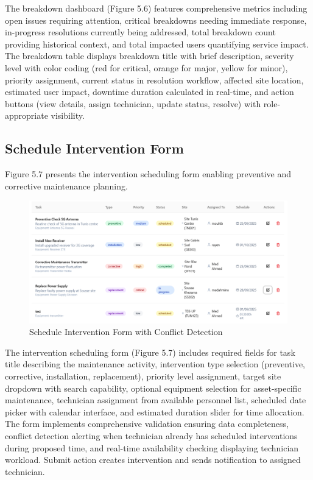 The breakdown dashboard (Figure 5.6) features comprehensive metrics including open issues requiring attention, critical breakdowns needing immediate response, in-progress resolutions currently being addressed, total breakdown count providing historical context, and total impacted users quantifying service impact. The breakdown table displays breakdown title with brief description, severity level with color coding (red for critical, orange for major, yellow for minor), priority assignment, current status in resolution workflow, affected site location, estimated user impact, downtime duration calculated in real-time, and action buttons (view details, assign technician, update status, resolve) with role-appropriate visibility.

\subsection{Schedule Intervention Form}

Figure 5.7 presents the intervention scheduling form enabling preventive and corrective maintenance planning.

\begin{figure}[H]
    \centering
    \includegraphics[width=0.7\linewidth]{img/chap_05/screenshot_schedule_intervention.png}
    \caption{Schedule Intervention Form with Conflict Detection}
    \label{fig:schedule_intervention_form}
\end{figure}

The intervention scheduling form (Figure 5.7) includes required fields for task title describing the maintenance activity, intervention type selection (preventive, corrective, installation, replacement), priority level assignment, target site dropdown with search capability, optional equipment selection for asset-specific maintenance, technician assignment from available personnel list, scheduled date picker with calendar interface, and estimated duration slider for time allocation. The form implements comprehensive validation ensuring data completeness, conflict detection alerting when technician already has scheduled interventions during proposed time, and real-time availability checking displaying technician workload. Submit action creates intervention and sends notification to assigned technician.

